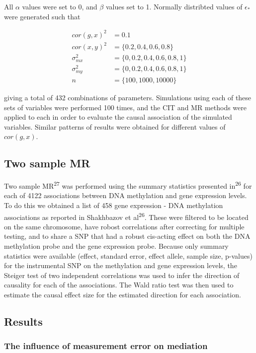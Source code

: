 \documentclass[]{article}
\begin{document}
All \(\alpha\) values were set to 0, and \(\beta\) values set to 1.
Normally distribted values of \(\epsilon_*\) were generated such that

\[
\begin{aligned}
cor(g, x)^2 & = 0.1 \\
cor(x, y)^2 & = \{0.2, 0.4, 0.6, 0.8\} \\
\sigma^2_{mx} & = \{0, 0.2, 0.4, 0.6, 0.8, 1\} \\
\sigma^2_{my} & = \{0, 0.2, 0.4, 0.6, 0.8, 1\} \\
n & = \{100, 1000, 10000\}
\end{aligned}
\]

giving a total of 432 combinations of parameters. Simulations using each
of these sets of variables were performed 100 times, and the CIT and MR
methods were applied to each in order to evaluate the causal association
of the simulated variables. Similar patterns of results were obtained
for different values of \(cor(g, x)\).

\subsection{Two sample MR}\label{two-sample-mr}

Two sample MR\textsuperscript{27} was performed using the summary
statistics presented in\textsuperscript{26} for each of 4122
associations between DNA methylation and gene expression levels. To do
this we obtained a list of 458 gene expression - DNA methylation
associations as reported in Shakhbazov et al\textsuperscript{26}. These
were filtered to be located on the same chromosome, have robost
correlations after correcting for multiple testing, and to share a SNP
that had a robust cis-acting effect on both the DNA methylation probe
and the gene expression probe. Because only summary statistics were
available (effect, standard error, effect allele, sample size, p-values)
for the instrumental SNP on the methylation and gene expression levels,
the Steiger test of two independent correlations was used to infer the
direction of causality for each of the associations. The Wald ratio test
was then used to estimate the causal effect size for the estimated
direction for each association.

\subsection{Results}\label{results}

\subsubsection{The influence of measurement error on
mediation}\label{the-influence-of-measurement-error-on-mediation}
\end{document}
